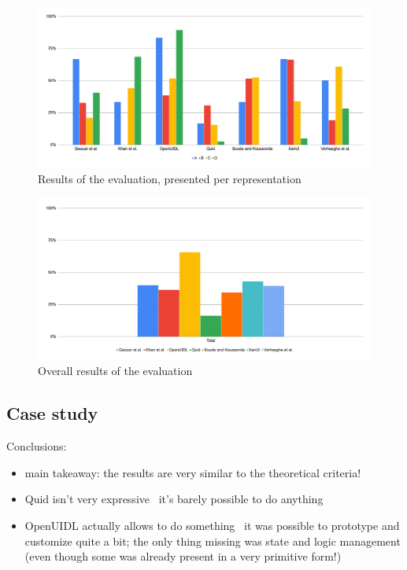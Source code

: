 \begin{figure}
    \centering
    \includegraphics[width=\textwidth]{4-results-and-discussion/results-per-representation}
    \caption{Results of the evaluation, presented per representation}
    \label{fig:4-2-results-per-representation}
\end{figure}

\begin{figure}
    \centering
    \includegraphics[width=\textwidth]{4-results-and-discussion/results-total}
    \caption{Overall results of the evaluation}
    \label{fig:4-2-results-total}
\end{figure}

\subsection{Case study}
Conclusions:
\begin{itemize}
    \item main takeaway: the results are very similar to the theoretical criteria!
    \item Quid isn't very expressive \textendash\ it's barely possible to do anything
    \item OpenUIDL actually allows to do something \textendash\  it was possible to prototype and customize quite a bit; the only thing missing was state and logic management (even though some was already present in a very primitive form!)
\end{itemize}

